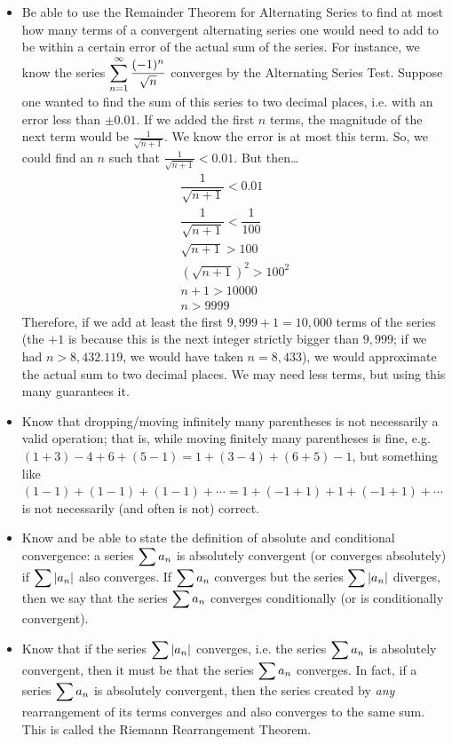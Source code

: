 \documentclass[11pt,letterpaper]{article}
\begin{document}
\begin{itemize}
\item Be able to use the Remainder Theorem for Alternating Series to find at most how many terms of a convergent alternating series one would need to add to be within a certain error of the actual sum of the series. For instance, we know the series $\displaystyle\sum_{n=1}^\infty \dfrac{(-1)^n}{\sqrt{n}}$ converges by the Alternating Series Test. Suppose one wanted to find the sum of this series to two decimal places, i.e. with an error less than $\pm 0.01$. If we added the first $n$ terms, the magnitude of the next term would be $\frac{1}{\sqrt{n+1}}$. We know the error is at most this term. So, we could find an $n$ such that $\frac{1}{\sqrt{n+1}} < 0.01$. But then\dots
	\[
	\begin{gathered}
	\dfrac{1}{\sqrt{n+1}} < 0.01 \\[0.2cm]
	\dfrac{1}{\sqrt{n+1}} < \dfrac{1}{100} \\[0.2cm]
	\sqrt{n+1} > 100 \\[0.2cm]
	(\sqrt{n+1})^2 > 100^2 \\[0.2cm]
	n + 1 > 10000 \\[0.2cm]
	n > 9999
	\end{gathered}
	\]
Therefore, if we add at least the first $9,\!999+1= 10,\!000$ terms of the series (the $+1$ is because this is the next integer strictly bigger than $9,\!999$; if we had $n > 8,\!432.119$, we would have taken $n= 8,\!433$), we would approximate the actual sum to two decimal places. We may need less terms, but using this many guarantees it. 

\item Know that dropping/moving infinitely many parentheses is not necessarily a valid operation; that is, while moving finitely many parentheses is fine, e.g. $(1 + 3) - 4 + 6 + (5 - 1)= 1 + (3 - 4) + (6 + 5) - 1$, but something like $(1 - 1) + (1 - 1) + (1 - 1) + \cdots= 1 + (-1 + 1) + 1 + (-1 + 1) + \cdots$ is not necessarily (and often is not) correct. 

\item Know and be able to state the definition of absolute and conditional convergence: a series $\displaystyle\sum a_n$ is absolutely convergent (or converges absolutely) if $\displaystyle\sum |a_n|$ also converges. If $\displaystyle\sum a_n$ converges but the series $\displaystyle\sum |a_n|$ diverges, then we say that the series $\displaystyle\sum a_n$ converges conditionally (or is conditionally convergent). 

\item Know that if the series $\displaystyle\sum |a_n|$ converges, i.e. the series $\displaystyle\sum a_n$ is absolutely convergent, then it must be that the series $\displaystyle\sum a_n$ converges. In fact, if a series $\displaystyle\sum a_n$ is absolutely convergent, then the series created by  \textit{any} rearrangement of its terms converges and also converges to the same sum. This is called the Riemann Rearrangement Theorem.


\end{itemize}
\end{document}
